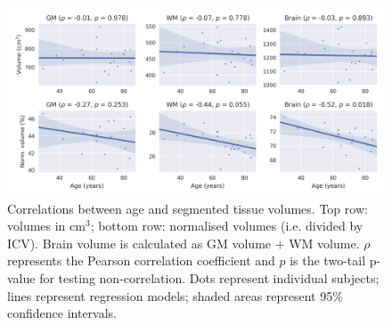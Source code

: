 \begin{figure}
  \centering
  \includegraphics[width=\textwidth]{figures/volumes_stats_pearson}
  \caption{Correlations between age and segmented tissue volumes. Top row: volumes in cm$^3$; bottom row: normalised volumes (i.e. divided by ICV). Brain volume is calculated as GM volume + WM volume. $\rho$ represents the Pearson correlation coefficient and $p$ is the two-tail p-value for testing non-correlation. Dots represent individual subjects; lines represent regression models; shaded areas represent 95\% confidence intervals.}
  \label{fig:volumes-correlations}
\end{figure}

